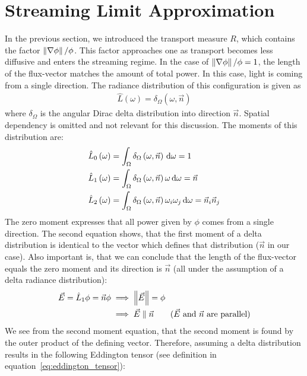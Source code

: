 \section{Streaming Limit Approximation}
\label{sec:fld_streaming_limit_approximation}

In the previous section, we introduced the transport measure $R$, which contains the factor $\left\lVert\nabla\phi\right\rVert/\phi$. This factor approaches one as transport becomes less diffusive and enters the streaming regime. In the case of $\left\lVert\nabla\phi\right\rVert/\phi=1$, the length of the flux-vector matches the amount of total power. In this case, light is coming from a single direction. The radiance distribution of this configuration is given as
\begin{align}
\hat{L}\left(\omega\right)=\delta_{\Omega}\left(\omega,\vec{n}\right)
\end{align}
where $\delta_{\Omega}$ is the angular Dirac delta distribution into direction $\vec{n}$. Spatial dependency is omitted and not relevant for this discussion. The moments of this distribution are:
\begin{align}
\label{eq:zero_moment_Lhat}
\hat{L}_0\left(\omega\right)&=\int_{\Omega}{\delta_{\Omega}\left(\omega,\vec{n}\right)\,\mathrm{d}\omega} = 1\\
\label{eq:first_moment_Lhat}
\hat{L}_1\left(\omega\right)&=\int_{\Omega}{\delta_{\Omega}\left(\omega,\vec{n}\right)\omega\,\mathrm{d}\omega} = \vec{n}\\
\label{eq:second_moment_Lhat}
\hat{L}_2\left(\omega\right)&=\int_{\Omega}{\delta_{\Omega}\left(\omega,\vec{n}\right)\omega_i\omega_j\,\mathrm{d}\omega} = \vec{n}_i\vec{n}_j
\end{align}
The zero moment expresses that all power given by $\phi$ comes from a single direction. The second equation shows, that the first moment of a delta distribution is identical to the vector which defines that distribution ($\vec{n}$ in our case). Also important is, that we can conclude that the length of the flux-vector equals the zero moment and its direction is $\vec{n}$ (all under the assumption of a delta radiance distribution):
\begin{align}
\label{eq:iso_delta_normE}
\vec{E} = \hat{L}_1\phi = \vec{n}\phi  &\implies \left\lVert\vec{E}\right\rVert = \phi\\
&\implies \vec{E} \parallel \vec{n} \qquad \text{($\vec{E}$ and $\vec{n}$ are parallel)}
\end{align}
We see from the second moment equation, that the second moment is found by the outer product of the defining vector. Therefore, assuming a delta distribution results in the following Eddington tensor (see definition in equation~\ref{eq:eddington_tensor}):
